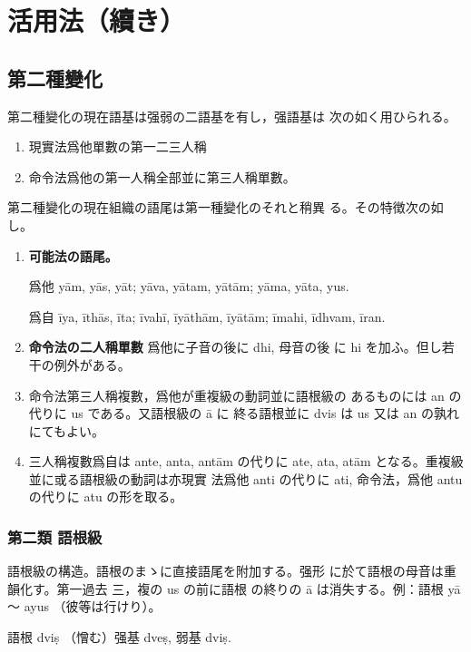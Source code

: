 \section{活用法（續き）}
\subsection{第二種變化}
\numberParagraph \label{np:136}
第二種變化の現在語基は强弱の二語基を有し，强語基は
次の如く用ひられる。
\begin{enumerate}[label=(\alph*)]
\item 現實法爲他單數の第一二三人稱
\item 命令法爲他の第一人稱全部並に第三人稱單數。
\end{enumerate}

\numberParagraph
第二種變化の現在組織の語尾は第一種變化のそれと稍異
る。その特徴次の如し。
\begin{enumerate}[label=(\alph*)]
\item \textbf{可能法の語尾。}

爲他 yām, yās, yāt; yāva, yātam, yātām; yāma,
yāta, yus.

爲自 īya, īthās, īta; īvahī, īyāthām, īyātām; īmahi,
īdhvam, īran.
\item \textbf{命令法の二人稱單數} 爲他に子音の後に dhi, 母音の後
に hi を加ふ。但し若干の例外がある。
\item 命令法第三人稱複數，爲他が重複級の動詞並に語根級の
あるものには an の代りに us である。又語根級の ā に
終る語根並に dvis は us 又は an の孰れにてもよい。
\item 三人稱複數爲自は ante, anta, antām の代りに ate,
ata, atām となる。重複級並に或る語根級の動詞は亦現實
法爲他 anti の代りに ati, 命令法，爲他 antu の代りに
atu の形を取る。
\end{enumerate}

\subsubsection{第二類 語根級}
\numberParagraph
語根級の構造。語根のまゝに直接語尾を附加する。强形
に於て語根の母音は重韻化す。第一過去 三，複の us の前に語根
の終りの ā は消失する。例：語根 yā ～ ayus （彼等は行けり）。

\numberParagraph
語根 dviṣ （憎む）强基 dveṣ, 弱基 dviṣ.

